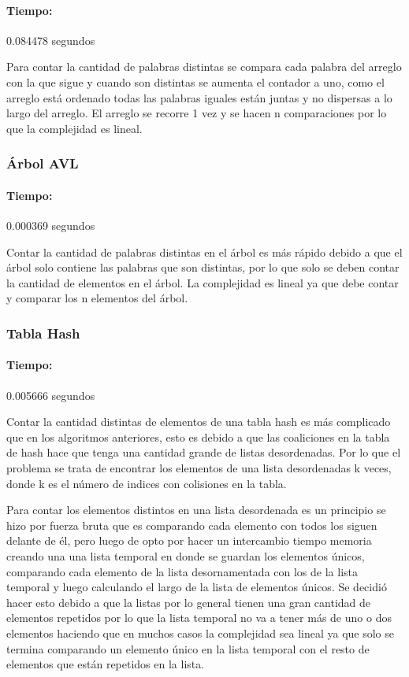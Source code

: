 \documentclass[12pt,letterpaper]{scrartcl}
\begin{document}
\paragraph{Tiempo:} 0.084478 segundos

Para contar la cantidad de palabras distintas se compara cada palabra del arreglo con la que sigue y cuando son distintas se aumenta el contador a uno, como el arreglo está ordenado todas las palabras iguales están juntas y no dispersas a lo largo del arreglo. El arreglo se recorre 1 vez y se hacen n comparaciones por lo que la complejidad es lineal.


\subsubsection{Árbol AVL}

\paragraph{Tiempo:} 0.000369 segundos

Contar la cantidad de palabras distintas en el árbol es más rápido debido a que el árbol solo contiene las palabras que son distintas, por lo que solo se deben contar la cantidad de elementos en el árbol. La complejidad es lineal ya que debe contar y comparar los n elementos del árbol.

\subsubsection{Tabla Hash}

\paragraph{Tiempo:} 0.005666 segundos

Contar la cantidad distintas de elementos de una tabla hash es más complicado que en los algoritmos anteriores, esto es debido a que las coaliciones en la tabla de hash hace que tenga una cantidad grande de listas desordenadas. Por lo que el problema se trata de encontrar los elementos de una lista desordenadas k veces, donde k es el número de indices con colisiones en la tabla.

Para contar los elementos distintos en una lista desordenada es un principio se hizo por fuerza bruta que es comparando cada elemento con todos los siguen delante de él, pero luego de opto por hacer un intercambio tiempo memoria creando una una lista temporal en donde se guardan los elementos únicos, comparando cada elemento de la lista desornamentada con los de la lista temporal y luego calculando el largo de la lista de elementos únicos. Se decidió hacer esto debido a que la listas por lo general tienen una gran cantidad de elementos repetidos por lo que la lista temporal no va a tener más de uno o dos elementos haciendo que en muchos casos la complejidad sea lineal ya que solo se termina comparando un elemento único en la lista temporal con el resto de elementos que están repetidos en la lista.
\end{document}
